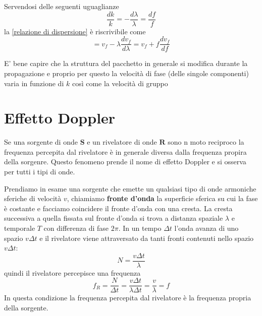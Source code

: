 \documentclass[x11names]{report}
\begin{document}
	\begin{es}{}
		Servendosi delle seguenti uguaglianze
		\[ 
		\boxed{\frac{dk}{k}} = \boxed{-\frac{d\lambda}{\lambda}} = \boxed{\frac{df}{f}}
		\]
		la \ref{relazione di dispersione} è riscrivibile come 
		\[ 
		= v_f - \lambda \frac{dv_f}{d\lambda} = v_f + f\frac{dv_f}{df}
		\]
	\end{es}
	
	E' bene capire che la struttura del pacchetto in generale si modifica durante la propagazione e proprio per questo la velocità di fase (delle singole componenti) varia in funzione di \(k\) così come la velocità di gruppo
	\newpage
	\section{Effetto Doppler}
	Se una sorgente di onde \(\boldsymbol{S}\) e un rivelatore di onde \(\boldsymbol{R}\) sono n moto reciproco la frequenza percepita dal rivelatore è in generale diversa dalla frequenza propira della sorgenre. Questo fenomeno prende il nome di effetto Doppler e si osserva per tutti i tipi di onde.
	
	Prendiamo in esame una sorgente che emette un qualsiasi tipo di onde armoniche sferiche di velocità \(v\), chiamiamo \textbf{fronte d'onda} la superficie sferica su cui la fase è costante e facciamo coincidere il fronte d'onda con una cresta. La cresta successiva a quella fissata sul fronte d'onda si trova a distanza spaziale \(\lambda\) e temporale \(T\) con differenza di fase \(2\pi \). In un tempo \(\Delta t\) l'onda avanza di uno spazio \(v\Delta t\) e il rivelatore viene attraversato da tanti fronti contenuti nello spazio \(v\Delta t\): 
	\[ 
	N = \frac{v\Delta t}{\lambda}
	\]
	quindi il rivelatore percepisce una frequenza
	\[
	f_R = \frac{N}{\Delta t}= \frac{v\Delta t}{\lambda \Delta t} = \frac{v}{\lambda} = f
	\]
	In questa condizione la frequenza percepita dal rivelatore è la frequenza propria della sorgente.
	
\end{document}
